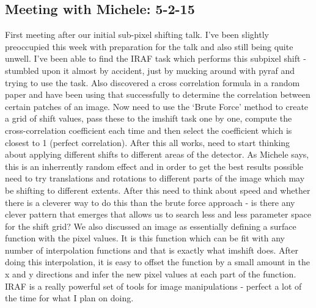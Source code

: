 \documentclass{literature}
\begin{document}
\subsection{Meeting with Michele: 5-2-15}
First meeting after our initial sub-pixel shifting talk. I've been slightly preoccupied this week with preparation for the talk and also still being quite unwell. I've been able to find the IRAF task which performs this subpixel shift - stumbled upon it almost by accident, just by mucking around with pyraf and trying to use the task. Also discovered a cross correlation formula in a random paper and have been using that successfully to determine the correlation between certain patches of an image. Now need to use the `Brute Force' method to create a grid of shift values, pass these to the imshift task one by one, compute the cross-correlation coefficient each time and then select the coefficient which is closest to 1 (perfect correlation). After this all works, need to start thinking about applying different shifts to different areas of the detector. As Michele says, this is an inherrently random effect and in order to get the best results possible need to try translations and rotations to different parts of the image which may be shifting to different extents. After this need to think about speed and whether there is a cleverer way to do this than the brute force approach - is there any clever pattern that emerges that allows us to search less and less parameter space for the shift grid? We also discussed an image as essentially defining a surface function with the pixel values. It is this function which can be fit with any number of interpolation functions and that is exactly what imshift does. After doing this interpolation, it is easy to offset the function by a small amount in the x and y directions and infer the new pixel values at each part of the function. IRAF is a really powerful set of tools for image manipulations - perfect a lot of the time for what I plan on doing. 
\end{document}
